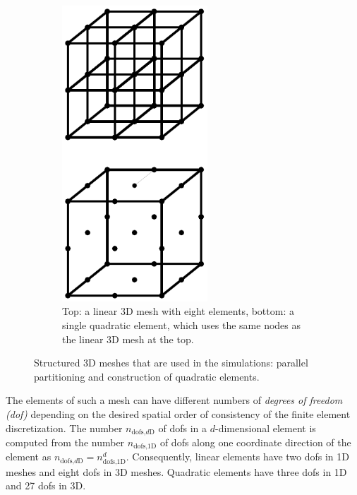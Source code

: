 \begin{figure}
\begin{subfigure}[t]{0.45\textwidth}
    \includegraphics[width=0.6\textwidth]{images/fiber_creation/quadratic_elements.pdf}%
    \caption{Top: a linear 3D mesh with eight elements, bottom: a single quadratic element, which uses the same nodes as the linear 3D mesh at the top.}%
    \label{fig:fiber_creation_quadratic_elements}%
  \end{subfigure}    
  \caption{Structured 3D meshes that are used in the simulations: parallel partitioning and construction of quadratic elements.}%
  \label{fig:quadratic_elements_decomposition}%
\end{figure}%

The elements of such a mesh can have different numbers of \emph{degrees of freedom (dof)} depending on the desired spatial order of consistency of the finite element discretization. The number $n_{\text{dofs,}d\text{D}}$ of dofs in a $d$-dimensional element is computed from the number $n_{\text{dofs,1D}}$ of dofs along one coordinate direction of the element as $n_{\text{dofs,}d\text{D}} = n_{\text{dofs,1D}}^d$.
Consequently, linear elements have two dofs in 1D meshes and eight dofs in 3D meshes. Quadratic elements have three dofs in 1D and 27 dofs in 3D.


